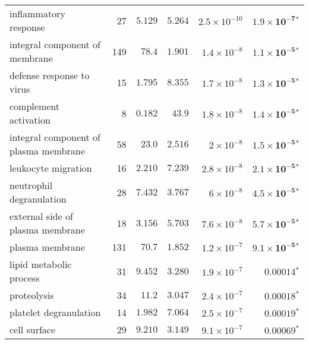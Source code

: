 \documentclass{article}
\begin{document}
\begin{longtable}{|l|r|r|r|r|r|}
                             inflammatory response &                      27 &                $ 5.129$ &   $ 5.264$ & $2.5\times 10^{-10}$ &   $\bm{1.9\times 10^{-7}{^*}}$ \\
                    integral component of membrane &                     149 &                $  78.4$ &   $ 1.901$ &  $1.4\times 10^{-8}$ &   $\bm{1.1\times 10^{-5}{^*}}$ \\
                         defense response to virus &                      15 &                $ 1.795$ &   $ 8.355$ &  $1.7\times 10^{-8}$ &   $\bm{1.3\times 10^{-5}{^*}}$ \\
                             complement activation &                       8 &                $ 0.182$ &   $  43.9$ &  $1.8\times 10^{-8}$ &   $\bm{1.4\times 10^{-5}{^*}}$ \\
             integral component of plasma membrane &                      58 &                $  23.0$ &   $ 2.516$ &   $ 2\times 10^{-8}$ &   $\bm{1.5\times 10^{-5}{^*}}$ \\
                               leukocyte migration &                      16 &                $ 2.210$ &   $ 7.239$ &  $2.8\times 10^{-8}$ &   $\bm{2.1\times 10^{-5}{^*}}$ \\
                          neutrophil degranulation &                      28 &                $ 7.432$ &   $ 3.767$ &   $ 6\times 10^{-8}$ &   $\bm{4.5\times 10^{-5}{^*}}$ \\
                  external side of plasma membrane &                      18 &                $ 3.156$ &   $ 5.703$ &  $7.6\times 10^{-8}$ &   $\bm{5.7\times 10^{-5}{^*}}$ \\
                                   plasma membrane &                     131 &                $  70.7$ &   $ 1.852$ &  $1.2\times 10^{-7}$ &   $\bm{9.1\times 10^{-5}{^*}}$ \\
                           lipid metabolic process &                      31 &                $ 9.452$ &   $ 3.280$ &  $1.9\times 10^{-7}$ &             $\bm{0.00014{^*}}$ \\
                                       proteolysis &                      34 &                $  11.2$ &   $ 3.047$ &  $2.4\times 10^{-7}$ &             $\bm{0.00018{^*}}$ \\
                            platelet degranulation &                      14 &                $ 1.982$ &   $ 7.064$ &  $2.5\times 10^{-7}$ &             $\bm{0.00019{^*}}$ \\
                                      cell surface &                      29 &                $ 9.210$ &   $ 3.149$ &  $9.1\times 10^{-7}$ &             $\bm{0.00069{^*}}$ \\

\end{longtable}
\end{document}
